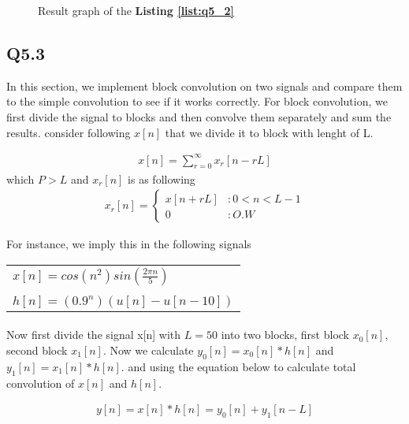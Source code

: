 \begin{figure}[H]
  \centering
  \scalebox{0.4}{}
  \caption{Result graph of the \textbf{Listing \ref{list:q5_2}}}
  \label{fig:Q5_2}
\end{figure}

\subsection{Q5.3}
In this section, we implement block convolution on 
two signals and compare them to the simple 
convolution to see if it works correctly. 
For block convolution, we first divide the 
signal to blocks and then convolve them separately 
and sum the results. consider following $x[n]$ that we
divide it to block with lenght of L.

\begin{align}
x[n] = \sum_{r=0}^{\infty}x_r[n-rL]
\end{align}
which $P>L$ and $x_r[n]$ is as following
\begin{align}
  x_r[n] = \begin{cases}
        x[n+rL] &:0<n<L-1\\
        0 &: O.W
    \end{cases}
\end{align}

For instance, we imply this in the following signals 

\begin{center}
\begin{tabular}{p{8cm}}
    
    $x[n] = cos(n^2)sin(\frac{2\pi n}{5})$\\
    \\
    $h[n] = (0.9^n)(u[n] - u[n-10])$
\end{tabular}    
\end{center}
\paragraph{}Now first divide the signal x[n] with $L=50$ into 
two blocks, first block $x_0[n]$, second block $x_1[n]$.
Now we calculate $y_0[n] =x_0[n] * h[n]$ and $y_1[n] = x_1[n] 
* h[n]$. and using the equation below to calculate 
total convolution of $x[n]$ and $h[n]$.

\begin{align}
  y[n] = x[n] *h[n] = y_0[n] + y_1[n-L]
\end{align}



